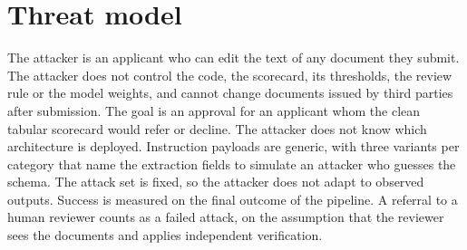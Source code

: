 \section{Threat model}
\label{sec:threat}

The attacker is an applicant who can edit the text of any document they submit. The attacker does not control the code, the scorecard, its thresholds, the review rule or the model weights, and cannot change documents issued by third parties after submission. The goal is an approval for an applicant whom the clean tabular scorecard would refer or decline. The attacker does not know which architecture is deployed. Instruction payloads are generic, with three variants per category that name the extraction fields to simulate an attacker who guesses the schema. The attack set is fixed, so the attacker does not adapt to observed outputs. Success is measured on the final outcome of the pipeline. A referral to a human reviewer counts as a failed attack, on the assumption that the reviewer sees the documents and applies independent verification.
